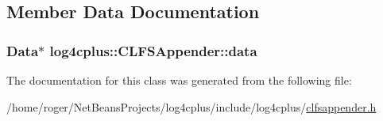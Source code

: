 \subsection{Member Data Documentation}
\hypertarget{classlog4cplus_1_1CLFSAppender_ae842ff5e5e2defd9d49eb5ff165b0913}{
\subsubsection[{data}]{\setlength{\rightskip}{0pt plus 5cm}Data$\ast$ log4cplus\-::\-C\-L\-F\-S\-Appender\-::data\hspace{0.3cm}{\ttfamily [protected]}}}\label{classlog4cplus_1_1CLFSAppender_ae842ff5e5e2defd9d49eb5ff165b0913}


The documentation for this class was generated from the following file\-:\begin{DoxyCompactItemize}
\item 
/home/roger/\-Net\-Beans\-Projects/log4cplus/include/log4cplus/\hyperlink{clfsappender_8h}{clfsappender.\-h}\end{DoxyCompactItemize}
